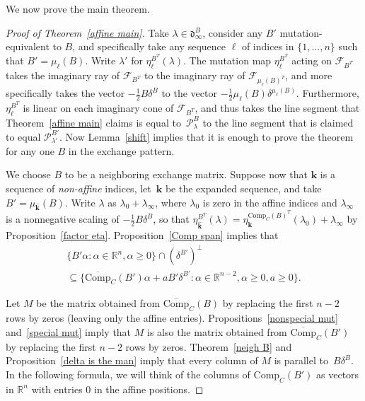 \documentclass[10pt]{article}
\theoremstyle{definition}
\theoremstyle{remark}
\numberwithin{equation}{section}
\newcommand{\reals}{\mathbb R}
\newcommand{\set}[1]{{\lbrace #1 \rbrace}}
\newcommand{\F}{{\mathcal F}}
\newcommand{\0}{{\mathbf{0}}}
\newcommand{\Comp}{\mathrm{Comp}_C}
\newcommand{\CompPlus}{\overline{\mathrm{Comp}}_C}
\newcommand{\kk}{{\boldsymbol{k}}}
\renewcommand{\ll}{{\boldsymbol\ell}}
\renewcommand{\P}{\mathcal{P}}
\renewcommand{\d}{{\mathfrak d}}
\begin{document}
We now prove the main theorem.

\begin{proof}[Proof of Theorem~\ref{affine main}]
Take $\lambda\in\d_\infty^B$, consider any $B'$ mutation-equivalent to $B$, and specifically take any sequence $\ll$ of indices in $\set{1,\ldots,n}$ such that $B'=\mu_\ll(B)$.
Write $\lambda'$ for $\eta_\ll^{B^T}(\lambda)$.
The mutation map $\eta_\ll^{B^T}$ acting on $\F_{B^T}$ takes the imaginary ray of $\F_{B^T}$ to the imaginary ray of $\F_{\mu_\ll(B)^T}$, and more specifically takes the vector $-\frac12B\delta^B$ to the vector $-\frac12\mu_\ll(B)\delta^{\mu_\ll(B)}$.
Furthermore, $\eta_\ll^{B^T}$ is linear on each imaginary cone of $\F_{B^T}$, and thus takes the line segment that Theorem~\ref{affine main} claims is equal to~$\P_\lambda^B$ to the line segment that is claimed to equal $\P_{\lambda'}^{B'}$.
Now Lemma~\ref{shift} implies that it is enough to prove the theorem for any one $B$ in the exchange pattern.

We choose $B$ to be a neighboring exchange matrix.
Suppose now that $\kk$ is a sequence of \emph{non-affine} indices, let~$\widehat\kk$ be the expanded sequence, and take ${B'=\mu_{\widehat\kk}(B)}$.
Write $\lambda$ as $\lambda_0+\lambda_\infty$, where $\lambda_0$ is zero in the affine indices and $\lambda_\infty$ is a nonnegative scaling of $-\frac12B\delta^B$, so that ${\eta^{B^T}_{\widehat\kk}(\lambda)=\eta_\kk^{\Comp(B)^T}(\lambda_0)+\lambda_\infty}$ by Proposition~\ref{factor eta}.
Proposition~\ref{Comp span} implies that 
\begin{multline*}
\set{B'\alpha:\alpha\in\reals^n,\alpha\ge0}\cap(\delta^{B'})^\perp\\
\subseteq\set{\CompPlus(B')\alpha+aB'\delta^{B'}:\alpha\in\reals^{n-2},\alpha\ge0,a\ge0}.
\end{multline*}

Let $M$ be the matrix obtained from $\CompPlus(B)$ by replacing the first $n-2$ rows by zeros (leaving only the affine entries).
Propositions~\ref{nonspecial mut} and~\ref{special mut} imply that $M$ is also the matrix obtained from $\CompPlus(B')$ by replacing the first $n-2$ rows by zeros.
Theorem~\ref{neigh B} and Proposition~\ref{delta is the man} imply that every column of $M$ is parallel to~$B\delta^B$.
In the following formula, we will think of the columns of $\Comp(B')$ as vectors in $\reals^n$ with entries $0$ in the affine positions.


\end{proof}
\end{document}
